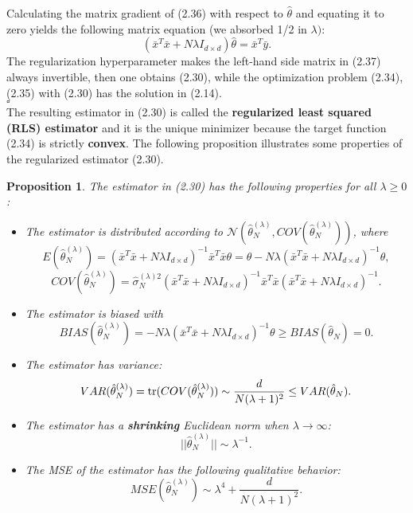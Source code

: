 \documentclass{report}
\newtheorem{proposition}{Proposition}[chapter]
\begin{document}
Calculating the matrix gradient of (2.36) with respect to $\hat{\theta}$ and equating it to zero yields the following matrix equation (we absorbed 1/2 in $\lambda)$:
\begin{equation}
(\bar{x}^T\bar{x}+ N\lambda I_{d\times d})\hat{\theta} = \bar{x}^T\bar{y}.
\end{equation}
The regularization hyperparameter makes the left-hand side matrix in (2.37) always invertible, then one obtains (2.30), while the optimization problem (2.34), (2.35) with (2.30) has the solution in (2.14).\\
$\square$\\
The resulting estimator in (2.30) is called the \textbf{regularized least squared (RLS) estimator} and it is the unique minimizer because the target function (2.34) is strictly \textbf{convex}. The following proposition illustrates some properties of the regularized estimator (2.30).

\begin{proposition}
The estimator in (2.30) has the following properties for all $\lambda \geq 0$:
\begin{itemize}
\item The estimator is distributed according to $\mathcal{N}(\hat{\theta}_N^{(\lambda)}, COV(\hat{\theta}_N^{(\lambda)}))$, where
\begin{equation}
E(\hat{\theta}_N^{(\lambda)}) =  (\bar{x}^T\bar{x}+N\lambda I_{d\times d})^{-1}\bar{x}^T\bar{x}\theta = \theta -N\lambda (\bar{x}^T\bar{x}+N\lambda I_{d\times d})^{-1}\theta,
\end{equation}
\begin{equation}
COV(\hat{\theta}_N^{(\lambda)}) =\hat{\sigma}_N^{(\lambda)2} (\bar{x}^T\bar{x}+N\lambda I_{d\times d})^{-1}\bar{x}^T\bar{x}(\bar{x}^T\bar{x}+N\lambda I_{d\times d})^{-1}.
\end{equation}
\item The estimator is biased with
\begin{equation}
BIAS(\hat{\theta}_N^{(\lambda)}) = -N\lambda (\bar{x}^T\bar{x}+N\lambda I_{d\times d})^{-1}\theta \geq BIAS(\hat{\theta}_N) = 0.
\end{equation}
\item The estimator has variance:
\begin{equation}
VAR(\hat{\theta}_N^{(\lambda)}) = \textup{tr}(COV(\hat{\theta}_N^{(\lambda)})) \sim \frac{d}{N(\lambda + 1)^2} \leq VAR(\hat{\theta}_N).
\end{equation}
\item The estimator has a \textbf{shrinking} Euclidean norm when $\lambda \to \infty$:
\begin{equation}
||\hat{\theta}_N^{(\lambda)}|| \sim \lambda^{-1}.
\end{equation}
\item The MSE of the estimator has the following qualitative behavior:
\begin{equation}
MSE(\hat{\theta}_N^{(\lambda)}) \sim \lambda^4 +  \frac{d}{N(\lambda + 1)^2}.
\end{equation}
\end{itemize}
\end{proposition}
\end{document}
